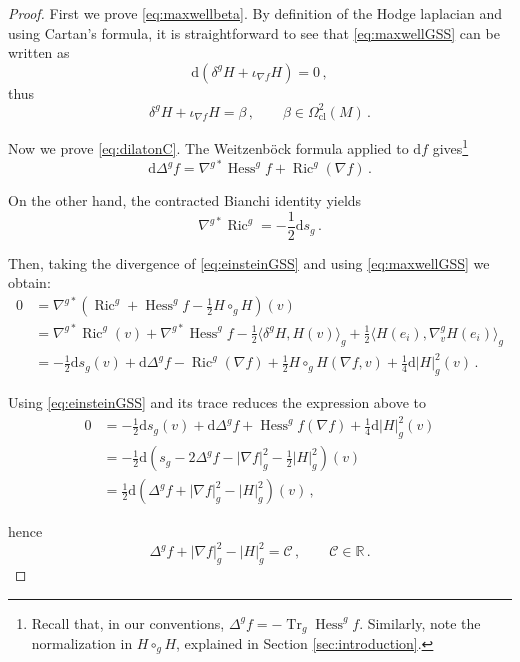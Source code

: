 \documentclass[12pt,a4paper,reqno]{amsart}
\theoremstyle{plain}
\theoremstyle{remark}
\numberwithin{equation}{section}
\newcommand{\cC}{\mathcal{C}}
\newcommand{\dd}{\mathrm{d}}
\newcommand{\R}{\mathbb{R}}
\DeclareMathOperator{\Ric}{\mathrm{Ric}}
\DeclareMathOperator{\Tr}{\mathrm{Tr}}
\DeclareMathOperator{\Hess}{\mathrm{Hess}}
\begin{document}
\begin{proof}
First we prove \eqref{eq:maxwellbeta}. By definition of the Hodge laplacian and using Cartan's formula, it is straightforward to see that \eqref{eq:maxwellGSS} can be written as
\begin{equation*}
\dd \left(\delta^gH + \iota_{\nabla f} H\right) = 0 \,,
\end{equation*}
thus
\begin{equation*}
\delta^gH + \iota_{\nabla f} H = \beta \,, \qquad \beta \in \Omega^2_{\mathrm{cl}}(M) \,.
\end{equation*}

Now we prove \eqref{eq:dilatonC}. The Weitzenböck formula applied to $\dd f$ gives\footnote{Recall that, in our conventions, $\Delta^g f=-\Tr_g\Hess^g f$. Similarly, note the normalization in $H\circ_g H$, explained in Section \ref{sec:introduction}.}
\begin{equation*}
\dd\Delta^g f = \nabla^{g \ast}\Hess^g f + \Ric^g(\nabla f) \,.
\end{equation*}

On the other hand, the contracted Bianchi identity yields
\begin{equation*}
\nabla^{g \ast}\Ric^g = - \frac{1}{2}\dd s_g \,. 
\end{equation*}

Then, taking the divergence of \eqref{eq:einsteinGSS} and using \eqref{eq:maxwellGSS} we obtain:
\begin{align*}
0 &= \nabla^{g \ast}\left(\Ric^g + \Hess^g f - \frac{1}{2}H \circ_g H\right)(v) \\
&= \nabla^{g \ast}\Ric^g(v) + \nabla^{g \ast}\Hess^g f - \frac{1}{2}\langle\delta^gH, H(v)\rangle_g + \frac{1}{2}\langle H(e_i),\nabla^g_vH(e_i) \rangle_g \\
&= -\frac{1}{2}\dd s_g(v) + \dd\Delta^g f - \Ric^g(\nabla f) + \frac{1}{2}H \circ_g H(\nabla f,v) + \frac{1}{4}\dd|H|_g^2(v) \,.
\end{align*}

Using \eqref{eq:einsteinGSS} and its trace reduces the expression above to
\begin{align*}
0 &= -\frac{1}{2}\dd s_g(v) + \dd\Delta^g f + \Hess^g f(\nabla f) + \frac{1}{4}\dd|H|_g^2(v) \\
&= - \frac{1}{2}\dd\left(s_g -  2\Delta^g f - |\nabla f|_g^2 - \frac{1}{2}|H|_g^2 \right)(v) \\
&= \frac{1}{2}\dd\left(\Delta^g f + |\nabla f|_g^2 - |H|_g^2 \right)(v) \,,
\end{align*}

hence
\begin{equation}\label{eq:dilaton}
\Delta^g f + |\nabla f|_g^2 - |H|_g^2 = \cC \,, \qquad \cC \in \R \,.
\end{equation}
\end{proof}
\end{document}
